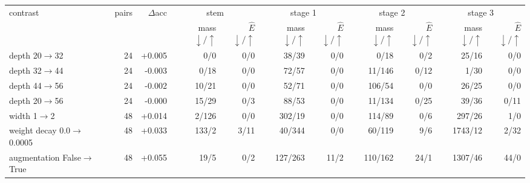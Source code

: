 \begin{tabular}{@{}lrrrrrrrrrr@{}}
\toprule
contrast & pairs & $\Delta$acc & \multicolumn{2}{c}{stem} & \multicolumn{2}{c}{stage 1} & \multicolumn{2}{c}{stage 2} & \multicolumn{2}{c}{stage 3} \\
 & & & mass $\downarrow/\uparrow$ & $\widehat E$ $\downarrow/\uparrow$ & mass $\downarrow/\uparrow$ & $\widehat E$ $\downarrow/\uparrow$ & mass $\downarrow/\uparrow$ & $\widehat E$ $\downarrow/\uparrow$ & mass $\downarrow/\uparrow$ & $\widehat E$ $\downarrow/\uparrow$ \\
\midrule
depth 20$\to$32 & 24 & +0.005 & 0/0 & 0/0 & 38/39 & 0/0 & 0/18 & 0/2 & 25/16 & 0/0 \\
depth 32$\to$44 & 24 & -0.003 & 0/18 & 0/0 & 72/57 & 0/0 & 11/146 & 0/12 & 1/30 & 0/0 \\
depth 44$\to$56 & 24 & -0.002 & 10/21 & 0/0 & 52/71 & 0/0 & 106/54 & 0/0 & 26/25 & 0/0 \\
depth 20$\to$56 & 24 & -0.000 & 15/29 & 0/3 & 88/53 & 0/0 & 11/134 & 0/25 & 39/36 & 0/11 \\
width 1$\to$2 & 48 & +0.014 & 2/126 & 0/0 & 302/19 & 0/0 & 114/89 & 0/6 & 297/26 & 1/0 \\
weight decay 0.0$\to$0.0005 & 48 & +0.033 & 133/2 & 3/11 & 40/344 & 0/0 & 60/119 & 9/6 & 1743/12 & 2/32 \\
augmentation False$\to$True & 48 & +0.055 & 19/5 & 0/2 & 127/263 & 11/2 & 110/162 & 24/1 & 1307/46 & 44/0 \\
\bottomrule
\end{tabular}
